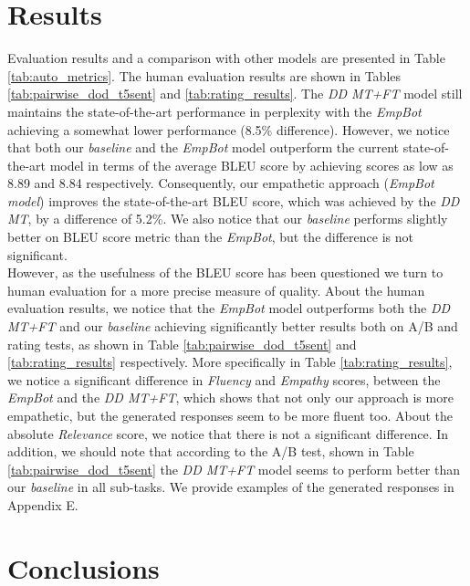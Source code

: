 \documentclass[11pt]{article}
\begin{document}
\section{Results}\label{sec:Results}
Evaluation results and a comparison with other models are presented in Table \ref{tab:auto_metrics}. The human evaluation results are shown in Tables \ref{tab:pairwise_dod_t5sent} and \ref{tab:rating_results}. 
The \textit{DD MT+FT} model still maintains the state-of-the-art performance in perplexity with the \textit{EmpBot} achieving a somewhat lower performance (8.5\% difference). However, we notice that both our \textit{baseline} and the \textit{EmpBot} model outperform the current state-of-the-art model in terms of the average BLEU score by achieving scores as low as 8.89 and 8.84 respectively. Consequently, our empathetic approach (\textit{EmpBot model}) improves the state-of-the-art BLEU score, which was achieved by the \textit{DD MT}, by a difference of 5.2\%. We also notice that our \textit{baseline} performs slightly better on BLEU score metric than the \textit{EmpBot}, but the difference is not  significant. 
\\
However, as the usefulness of the BLEU score has been questioned we turn to human evaluation for a more precise measure of quality. About the human evaluation results, we notice that the \textit{EmpBot} model outperforms both
the \textit{DD MT+FT}
and our \textit{baseline} achieving significantly better results both on A/B and rating tests, as shown in Table \ref{tab:pairwise_dod_t5sent} and \ref{tab:rating_results} respectively. More specifically in Table \ref{tab:rating_results}, we notice a significant difference in \textit{Fluency} and \textit{Empathy} scores, between the \textit{EmpBot} and the \textit {DD MT+FT}, which shows that not only our approach is more empathetic, but the generated responses seem to be more fluent too. About the absolute \textit{Relevance} score, we notice that there is not a significant difference. In addition, we should note that according to the A/B test, shown in Table \ref{tab:pairwise_dod_t5sent} the \textit{DD MT+FT} model seems to perform better than our \textit{baseline} in all sub-tasks. We provide examples of the generated responses in Appendix E.


\section{Conclusions}\label{sec:Conclusions}
\end{document}
